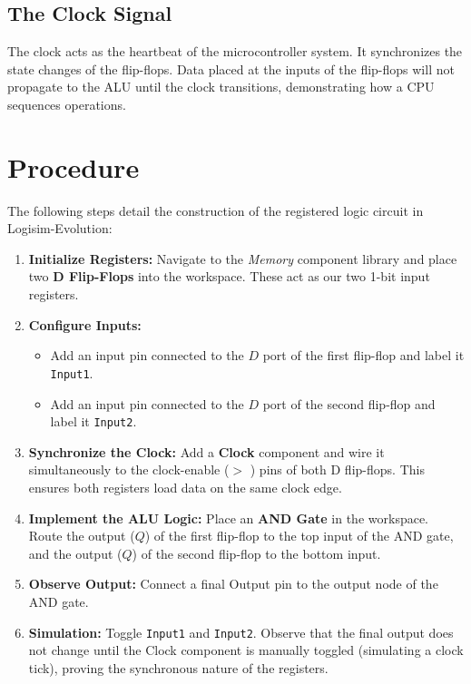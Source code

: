 \documentclass[11pt, a4paper]{article}
\begin{document}
\subsection{The Clock Signal}
The clock acts as the heartbeat of the microcontroller system. It synchronizes the state changes of the flip-flops. Data placed at the inputs of the flip-flops will not propagate to the ALU until the clock transitions, demonstrating how a CPU sequences operations.

\section{Procedure}
The following steps detail the construction of the registered logic circuit in Logisim-Evolution:

\begin{enumerate}
    \item \textbf{Initialize Registers:} Navigate to the \textit{Memory} component library and place two \textbf{D Flip-Flops} into the workspace. These act as our two 1-bit input registers.
    \item \textbf{Configure Inputs:} 
    \begin{itemize}
        \item Add an input pin connected to the $D$ port of the first flip-flop and label it \texttt{Input1}.
        \item Add an input pin connected to the $D$ port of the second flip-flop and label it \texttt{Input2}.
    \end{itemize}
    \item \textbf{Synchronize the Clock:} Add a \textbf{Clock} component and wire it simultaneously to the clock-enable ($>$ ) pins of both D flip-flops. This ensures both registers load data on the same clock edge.
    \item \textbf{Implement the ALU Logic:} Place an \textbf{AND Gate} in the workspace. Route the output ($Q$) of the first flip-flop to the top input of the AND gate, and the output ($Q$) of the second flip-flop to the bottom input.
    \item \textbf{Observe Output:} Connect a final Output pin to the output node of the AND gate.
    \item \textbf{Simulation:} Toggle \texttt{Input1} and \texttt{Input2}. Observe that the final output does not change until the Clock component is manually toggled (simulating a clock tick), proving the synchronous nature of the registers.
\end{enumerate}
\end{document}
